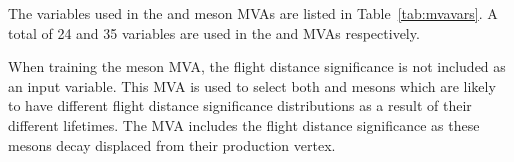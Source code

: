 The variables used in the \phiz and \Dsp meson MVAs are listed in Table~\ref{tab:mvavars}. 
A total of 24 and 35 variables are used in the \phiz and \Dsp MVAs respectively.

When training the \phiz meson MVA, the flight distance significance is not included as an input variable. This MVA is used to select both \phiz and \Dzb mesons which are likely to have different flight distance significance distributions as a result of their different lifetimes. The \Dsp MVA includes the flight distance significance as these mesons decay displaced from their production vertex.


